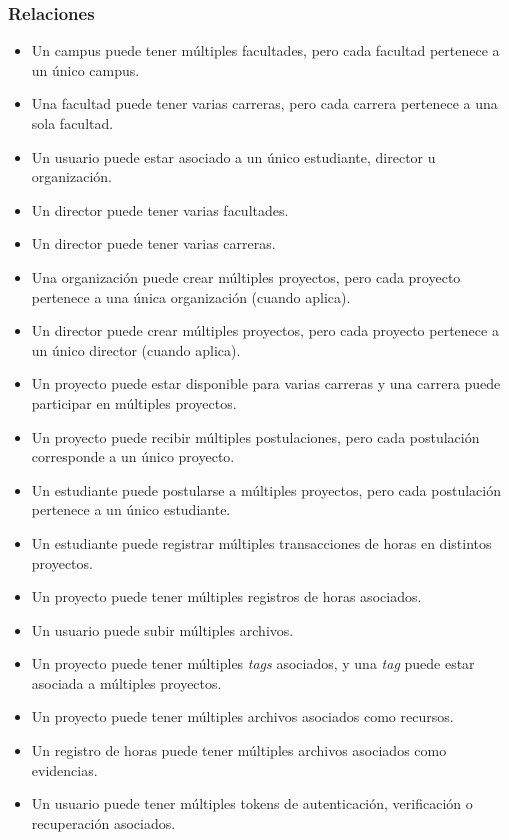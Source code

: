 \subsubsection{Relaciones}
\begin{itemize}
    \item Un campus puede tener múltiples facultades, pero cada facultad pertenece a un único campus.
    \item Una facultad puede tener varias carreras, pero cada carrera pertenece a una sola facultad.
    \item Un usuario puede estar asociado a un único estudiante, director u organización.
    \item Un director puede tener varias facultades.
    \item Un director puede tener varias carreras.
    \item Una organización puede crear múltiples proyectos, pero cada proyecto pertenece a una única organización (cuando aplica).
    \item Un director puede crear múltiples proyectos, pero cada proyecto pertenece a un único director (cuando aplica).
    \item Un proyecto puede estar disponible para varias carreras y una carrera puede participar en múltiples proyectos.
    \item Un proyecto puede recibir múltiples postulaciones, pero cada postulación corresponde a un único proyecto.
    \item Un estudiante puede postularse a múltiples proyectos, pero cada postulación pertenece a un único estudiante.
    \item Un estudiante puede registrar múltiples transacciones de horas en distintos proyectos.
    \item Un proyecto puede tener múltiples registros de horas asociados.
    \item Un usuario puede subir múltiples archivos.
    \item Un proyecto puede tener múltiples \textit{tags} asociados, y una \textit{tag} puede estar asociada a múltiples proyectos.
    \item Un proyecto puede tener múltiples archivos asociados como recursos.
    \item Un registro de horas puede tener múltiples archivos asociados como evidencias.
    \item Un usuario puede tener múltiples tokens de autenticación, verificación o recuperación asociados.
\end{itemize}

